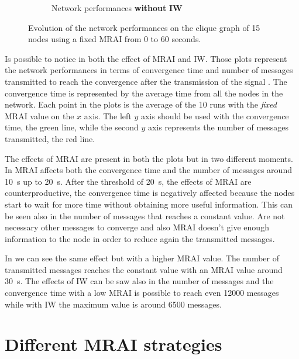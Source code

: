 \begin{figure}[h]
\begin{subfigure}[b]{0.45\textwidth}
		 \caption{Network performances \textbf{without} \textbf{\ac{IW}}}
         \label{fig:clique_evolution_noIW}
     \end{subfigure}
		\caption{Evolution of the network performances on the clique graph of \num{15}
			nodes using a fixed \ac{MRAI} from \num{0} to \num{60} seconds.}
        \label{fig:clique_evolution}
\end{figure}

Is possible to notice in  both the effect of \ac{MRAI}
and \ac{IW}.
Those plots represent the network performances in terms of convergence time and
number of messages transmitted to reach the convergence after the transmission
of the signal .
The convergence time is represented by the average time from all the nodes in the
network.
Each point in the plots is the average of the \num{10} runs with the \textit{fixed}
\ac{MRAI} value on the $x$ axis.
The left $y$ axis should be used with the convergence time, the green line, while
the second $y$ axis represents the number of messages transmitted, the red line.

The effects of \ac{MRAI} are present in both the plots but in two different
moments.
In  \ac{MRAI} affects both the convergence time and
the number of messages around \SI{10}{\second} up to \SI{20}{\second}.
After the threshold of \SI{20}{\second}, the effects of \ac{MRAI} are counterproductive,
the convergence time is negatively affected because the nodes start to wait for more
time without obtaining more useful information.
This can be seen also in the number of messages that reaches a constant value.
Are not necessary other messages to converge and also \ac{MRAI} doesn't give
enough information to the node in order to reduce again the transmitted messages.

In  we can see the same effect but with a higher
\ac{MRAI} value.
The number of transmitted messages reaches the constant value with an \ac{MRAI}
value around \SI{30}{\second}.
The effects of \ac{IW} can be saw also in the number of messages and the convergence
time with a low \ac{MRAI} is possible to reach even \num{12000} messages while
with \ac{IW} the maximum value is around \num{6500} messages.

\section{Different MRAI strategies}
\label{sec:bgp_mrai_strategies}

